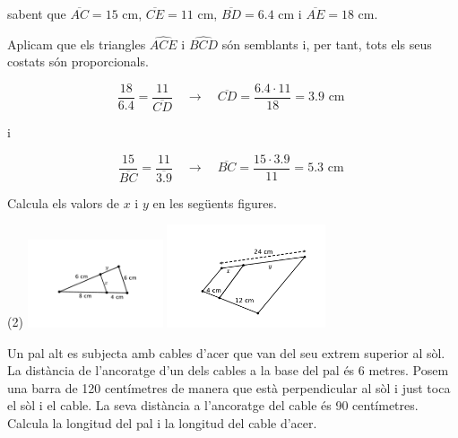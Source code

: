 \begin{mylist}
\begin{resolt}[E]
{sabent que  $\overline{AC}=15$ cm, $\overline{CE}=11$ cm, $\overline{BD}=6.4$ cm i $\overline{AE}=18$ cm.
}
		
		Aplicam que els triangles $\widehat{ACE}$ i $\widehat{BCD}$ són semblants i, per tant, tots els seus costats són proporcionals.
		
		\[ \frac{18}{6.4} = \frac{11}{\overline{CD}}  \quad \rightarrow \quad \overline{CD} = \frac{6.4 \cdot 11}{18} = 3.9 \text{ cm } \]
		
		\quad i
		
		
		\[ \frac{15}{\overline{BC}} = \frac{11}{\overline{3.9}}  \quad \rightarrow \quad \overline{BC} = \frac{15 \cdot 3.9}{11} = 5.3 \text{ cm } \]
\end{resolt}
\newpage

\exer[1]  Calcula els valors de  $x$ i $y$ en les següents figures. 

\begin{tasks}(2)
	\task   \includegraphics[width=0.3\textwidth]{img-09/trig-semblant2}
	\task    \includegraphics[width=0.35\textwidth]{img-09/trig-semblant5}
\end{tasks}
\answers[cols=1]{[$x=4$ i $y=3$ cm, $x=6$ i $y=18$ cm]}

\exer  Un pal alt es subjecta amb cables d'acer que van del seu extrem superior al sòl. La distància de l'ancoratge d'un dels cables a la base del pal és 6 metres. Posem una barra de 120 centímetres de manera que està perpendicular al sòl i just toca el sòl i el cable. La seva distància a l'ancoratge del cable és 90 centímetres. Calcula la longitud del pal i la longitud del cable d'acer.



\end{mylist}
